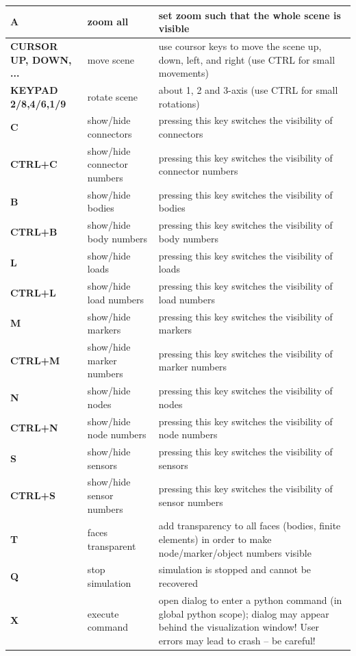 \documentclass[11pt,a4paper]{book}
\begin{document}
\begin{center}
\begin{longtable}{| p{4cm} | p{4cm} | p{8cm} |}
  \bf A & zoom all & set zoom such that the whole scene is visible \\ \hline
  \bf CURSOR UP, DOWN, ... & move scene& use coursor keys to move the scene up, down, left, and right (use CTRL for small movements)\\ \hline
  \bf KEYPAD 2/8,4/6,1/9 & rotate scene & about 1, 2 and 3-axis (use CTRL for small rotations) \\ \hline
  \bf C & show/hide connectors & pressing this key switches the visibility of connectors \\ \hline
  \bf CTRL+C & show/hide connector numbers & pressing this key switches the visibility of connector numbers \\ \hline
	\bf B & show/hide bodies & pressing this key switches the visibility of bodies \\ \hline
  \bf CTRL+B & show/hide body numbers & pressing this key switches the visibility of body numbers \\ \hline
	\bf L & show/hide loads & pressing this key switches the visibility of loads \\ \hline
  \bf CTRL+L & show/hide load numbers & pressing this key switches the visibility of load numbers \\ \hline
	\bf M & show/hide markers & pressing this key switches the visibility of markers \\ \hline
  \bf CTRL+M & show/hide marker numbers & pressing this key switches the visibility of marker numbers \\ \hline
	\bf N & show/hide nodes & pressing this key switches the visibility of nodes \\ \hline
  \bf CTRL+N & show/hide node numbers & pressing this key switches the visibility of node numbers \\ \hline
	\bf S & show/hide sensors & pressing this key switches the visibility of sensors \\ \hline
  \bf CTRL+S & show/hide sensor numbers & pressing this key switches the visibility of sensor numbers \\ \hline
	\bf T & faces transparent & add transparency to all faces (bodies, finite elements) in order to make node/marker/object numbers visible \\ \hline
	\bf Q & stop simulation & simulation is stopped and cannot be recovered \\ \hline
	\bf X & execute command & open dialog to enter a python command (in global python scope); dialog may appear behind the visualization window! User errors may lead to crash -- be careful! 

\end{longtable}
\end{center}
\end{document}
